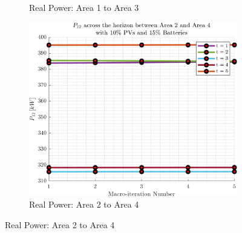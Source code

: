 \documentclass[../../outputs/main.tex]{subfiles}
\begin{document}
\begin{figure}[h!]
\begin{subfigure}[b]{0.3\textwidth}
        \caption{Real Power: Area 1 to Area 3}
        \label{fig:real_power_1_3}
    \end{subfigure}
    \hfill
    \begin{subfigure}[b]{0.3\textwidth}
        \centering
        \includegraphics[width=\textwidth]{../figures/T5-pv10-batt15-PBoundary/BoundaryRealPower_vs_t_vs_macroItr_5Areas_2_4_genCost_pv_10_batt_15_.png}
        \caption{Real Power: Area 2 to Area 4}
        \label{fig:real_power_2_4}
    \end{subfigure}
    

\end{figure}
\end{document}
